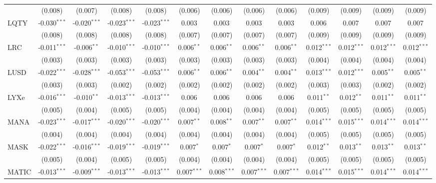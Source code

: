 \begin{table}[!htbp]
\begin{tabular}{@{\extracolsep{5pt}}lcccccccccccc}
  & (0.008) & (0.007) & (0.008) & (0.008) & (0.006) & (0.006) & (0.006) & (0.006) & (0.009) & (0.009) & (0.009) & (0.009) \\
 LQTY & -0.030$^{***}$ & -0.020$^{***}$ & -0.023$^{***}$ & -0.023$^{***}$ & 0.003$^{}$ & 0.003$^{}$ & 0.003$^{}$ & 0.003$^{}$ & 0.006$^{}$ & 0.007$^{}$ & 0.007$^{}$ & 0.007$^{}$ \\
  & (0.008) & (0.008) & (0.008) & (0.008) & (0.007) & (0.007) & (0.007) & (0.007) & (0.009) & (0.009) & (0.009) & (0.009) \\
 LRC & -0.011$^{***}$ & -0.006$^{**}$ & -0.010$^{***}$ & -0.010$^{***}$ & 0.006$^{**}$ & 0.006$^{**}$ & 0.006$^{**}$ & 0.006$^{**}$ & 0.012$^{***}$ & 0.012$^{***}$ & 0.012$^{***}$ & 0.012$^{***}$ \\
  & (0.003) & (0.003) & (0.003) & (0.003) & (0.003) & (0.003) & (0.003) & (0.003) & (0.004) & (0.004) & (0.004) & (0.004) \\
 LUSD & -0.022$^{***}$ & -0.028$^{***}$ & -0.053$^{***}$ & -0.053$^{***}$ & 0.006$^{**}$ & 0.006$^{**}$ & 0.004$^{**}$ & 0.004$^{**}$ & 0.013$^{***}$ & 0.012$^{***}$ & 0.005$^{**}$ & 0.005$^{**}$ \\
  & (0.003) & (0.003) & (0.002) & (0.002) & (0.002) & (0.002) & (0.002) & (0.002) & (0.003) & (0.003) & (0.002) & (0.002) \\
 LYXe & -0.016$^{***}$ & -0.010$^{**}$ & -0.013$^{***}$ & -0.013$^{***}$ & 0.006$^{}$ & 0.006$^{}$ & 0.006$^{}$ & 0.006$^{}$ & 0.011$^{**}$ & 0.012$^{**}$ & 0.011$^{**}$ & 0.011$^{**}$ \\
  & (0.005) & (0.004) & (0.005) & (0.005) & (0.004) & (0.004) & (0.004) & (0.004) & (0.005) & (0.005) & (0.005) & (0.005) \\
 MANA & -0.023$^{***}$ & -0.017$^{***}$ & -0.020$^{***}$ & -0.020$^{***}$ & 0.007$^{**}$ & 0.008$^{**}$ & 0.007$^{**}$ & 0.007$^{**}$ & 0.014$^{***}$ & 0.015$^{***}$ & 0.014$^{***}$ & 0.014$^{***}$ \\
  & (0.004) & (0.004) & (0.004) & (0.004) & (0.004) & (0.004) & (0.004) & (0.004) & (0.005) & (0.005) & (0.005) & (0.005) \\
 MASK & -0.022$^{***}$ & -0.016$^{***}$ & -0.019$^{***}$ & -0.019$^{***}$ & 0.007$^{*}$ & 0.007$^{*}$ & 0.007$^{*}$ & 0.007$^{*}$ & 0.012$^{**}$ & 0.013$^{**}$ & 0.013$^{**}$ & 0.013$^{**}$ \\
  & (0.005) & (0.004) & (0.005) & (0.005) & (0.004) & (0.004) & (0.004) & (0.004) & (0.005) & (0.005) & (0.005) & (0.005) \\
 MATIC & -0.013$^{***}$ & -0.009$^{***}$ & -0.013$^{***}$ & -0.013$^{***}$ & 0.007$^{***}$ & 0.008$^{***}$ & 0.007$^{***}$ & 0.007$^{***}$ & 0.014$^{***}$ & 0.015$^{***}$ & 0.014$^{***}$ & 0.014$^{***}$ \\

\end{tabular}
\end{table}
